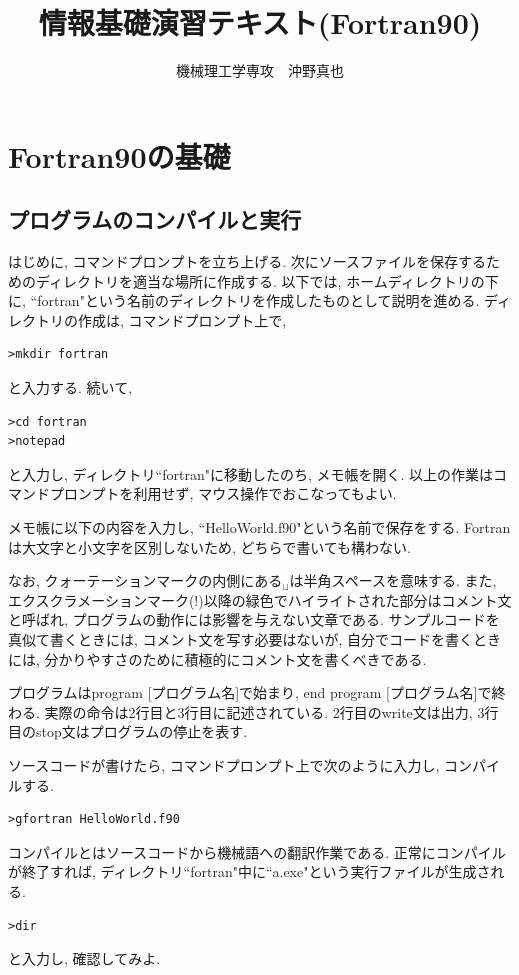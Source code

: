 \documentclass[a4j]{jsbook}
\begin{document}
\title{情報基礎演習テキスト(Fortran90)}
\author{機械理工学専攻　沖野真也}
\date{}
\maketitle

\chapter{Fortran90の基礎}

\section{プログラムのコンパイルと実行}
はじめに, コマンドプロンプトを立ち上げる. 
次にソースファイルを保存するためのディレクトリを適当な場所に作成する. 
以下では, ホームディレクトリの下に, ``fortran"という名前のディレクトリを作成したものとして説明を進める. 
ディレクトリの作成は, コマンドプロンプト上で, 
\begin{Verbatim}[frame=single]
>mkdir fortran
\end{Verbatim}
と入力する. 続いて, 
\begin{Verbatim}[frame=single]
>cd fortran
>notepad
\end{Verbatim}
と入力し, ディレクトリ``fortran"に移動したのち, メモ帳を開く. 
以上の作業はコマンドプロンプトを利用せず, マウス操作でおこなってもよい. 

メモ帳に以下の内容を入力し, ``HelloWorld.f90"という名前で保存をする. 
Fortranは大文字と小文字を区別しないため, どちらで書いても構わない. 

なお, クォーテーションマークの内側にある$_{\sqcup}$は半角スペースを意味する. 
また, エクスクラメーションマーク(!)以降の緑色でハイライトされた部分はコメント文と呼ばれ, 
プログラムの動作には影響を与えない文章である. 
サンプルコードを真似て書くときには, コメント文を写す必要はないが, 
自分でコードを書くときには, 分かりやすさのために積極的にコメント文を書くべきである. 

プログラムはprogram [プログラム名]で始まり, end program [プログラム名]で終わる. 
実際の命令は2行目と3行目に記述されている. 
2行目のwrite文は出力, 3行目のstop文はプログラムの停止を表す. 


ソースコードが書けたら, コマンドプロンプト上で次のように入力し, コンパイルする. 
\begin{Verbatim}[frame=single]
>gfortran HelloWorld.f90
\end{Verbatim}
コンパイルとはソースコードから機械語への翻訳作業である. 
正常にコンパイルが終了すれば, ディレクトリ``fortran"中に``a.exe"という実行ファイルが生成される. 
\begin{Verbatim}[frame=single]
>dir
\end{Verbatim}
と入力し, 確認してみよ. 
\end{document}
